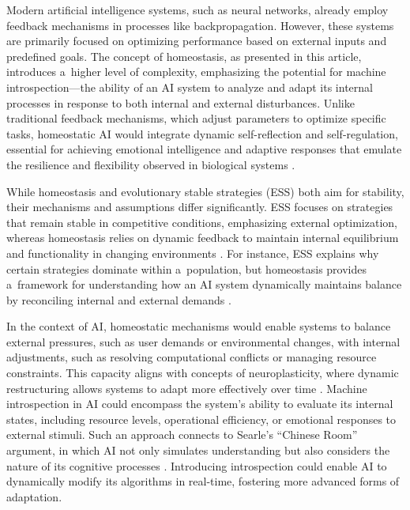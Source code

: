 Modern artificial intelligence systems, such as neural networks, already employ feedback mechanisms in processes like backpropagation. However, these systems are primarily focused on optimizing performance based on external inputs and predefined goals. The concept of homeostasis, as presented in this article, introduces a~higher level of complexity, emphasizing the potential for machine introspection---the ability of an AI system to analyze and adapt its internal processes in response to both internal and external disturbances. Unlike traditional feedback mechanisms, which adjust parameters to optimize specific tasks, homeostatic AI would integrate dynamic self-reflection and self-regulation, essential for achieving emotional intelligence and adaptive responses that emulate the resilience and flexibility observed in biological systems 
\parencites[][]{damasio_nature_2013}[][]{gros_emotions_2021}.%




While homeostasis and evolutionary stable strategies (ESS) both aim for stability, their mechanisms and assumptions differ significantly. ESS focuses on strategies that remain stable in competitive conditions, emphasizing external optimization, whereas homeostasis relies on dynamic feedback to maintain internal equilibrium and functionality in changing environments 
\parencites[][]{maynard_smith_theory_1974}[][]{dawkins_selfish_1989}. %
 For instance, ESS explains why certain strategies dominate within a~population, but homeostasis provides a~framework for understanding how an AI system dynamically maintains balance by reconciling internal and external demands 
\parencites[][]{walter_imitation_1950}[][]{ashby_design_1952}.%




In the context of AI, homeostatic mechanisms would enable systems to balance external pressures, such as user demands or environmental changes, with internal adjustments, such as resolving computational conflicts or managing resource constraints. This capacity aligns with concepts of neuroplasticity, where dynamic restructuring allows systems to adapt more effectively over time 
\parencite[][]{zhang_dynamic_2022}. %
 Machine introspection in AI could encompass the system's ability to evaluate its internal states, including resource levels, operational efficiency, or emotional responses to external stimuli. Such an approach connects to Searle's ``Chinese Room'' argument, in which AI not only simulates understanding but also considers the nature of its cognitive processes 
\parencite[][]{searle_minds_1980}. %
 Introducing introspection could enable AI to dynamically modify its algorithms in real-time, fostering more advanced forms of adaptation.



